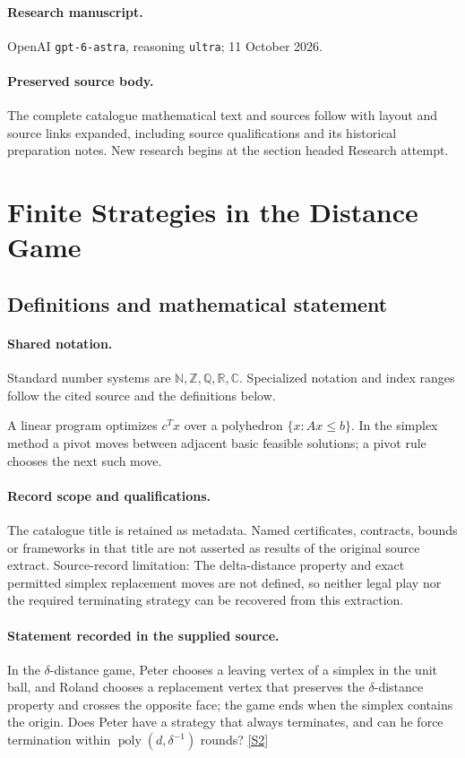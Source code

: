 \documentclass[11pt]{article}
\begin{document}
\paragraph{Research manuscript.} OpenAI \texttt{gpt-6-astra}, reasoning \texttt{ultra}; 11 October 2026.
\paragraph{Preserved source body.} The complete catalogue mathematical text and sources follow with layout and source links expanded, including source qualifications and its historical preparation notes. New research begins at the section headed Research attempt.

\section{Finite Strategies in the Distance Game}\label{statement}

\subsection{Definitions and mathematical statement}

\paragraph{Shared notation.}Standard number systems are $\mathbb N,\mathbb Z,\mathbb Q,\mathbb R,\mathbb C$. Specialized notation and index ranges follow the cited source and the definitions below.


A linear program optimizes $c^Tx$ over a polyhedron $\{x:Ax\leq b\}$. In the simplex method a pivot moves between adjacent basic feasible solutions; a pivot rule chooses the next such move.
\paragraph{Record scope and qualifications.}
The catalogue title is retained as metadata. Named certificates, contracts, bounds or frameworks in that title are not asserted as results of the original source extract.
Source-record limitation: The delta-distance property and exact permitted simplex replacement moves are not defined, so neither legal play nor the required terminating strategy can be recovered from this extraction.
\paragraph{Statement recorded in the supplied source.}
In the $\delta$-distance game, Peter chooses a leaving vertex of a simplex in the unit ball, and Roland chooses a replacement vertex that preserves the $\delta$-distance property and crosses the opposite face; the game ends when the simplex contains the origin. Does Peter have a strategy that always terminates, and can he force termination within $\operatorname{poly}(d,\delta^{-1})$ rounds? \href{https://doi.org/10.4171/owr/2024/50}{[S2]}
\end{document}
